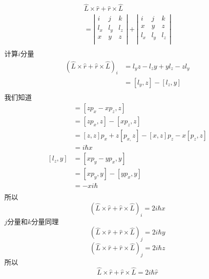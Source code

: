 $$
\begin{array}{l}
	\hat{L}\times \hat{r}+\hat{r}\times \hat{L}\\
	=\left| \begin{matrix}
	i&		j&		k\\
	l_x&		l_y&		l_z\\
	x&		y&		z\\
\end{matrix} \right|+\left| \begin{matrix}
	i&		j&		k\\
	x&		y&		z\\
	l_x&		l_y&		l_z\\
\end{matrix} \right|\\
\end{array}
$$
计算$i$分量
\begin{align}
\left(\hat{L}\times \hat{r}+\hat{r}\times \hat{L}\right)_i&= l_yz-l_zy+yl_z-zl_y\\
&=\left[ l_y,z \right] -\left[ l_z,y \right]\\
\end{align}
我们知道
\begin{align}
	[l_y,z]&=\left[ zp_x-xp_z,z \right]\\
	&=\left[ zp_x,z \right] -\left[ xp_z,z \right]\\
	&=[z,z]p_x+z\left[ p_{x,}z \right] -[x,z]p_z-x\left[ p_z,z \right]\\
	&=i\hbar x\\
	[l_z,y]&=\left[ xp_y-yp_x,y \right]\\
	&=\left[ xp_y,y \right] -[yp_x,y]\\
	&=-xi\hbar\\
\end{align}
所以
$$
\left(\hat{L}\times \hat{r}+\hat{r}\times \hat{L}\right)_i=2i\hbar x
$$
$j$分量和$k$分量同理
$$
\left(\hat{L}\times \hat{r}+\hat{r}\times \hat{L}\right)_j=2i\hbar y
$$$$
\left(\hat{L}\times \hat{r}+\hat{r}\times \hat{L}\right)_j=2i\hbar z
$$
所以
$$
\hat{L}\times \hat{r}+\hat{r}\times \hat{L}=2i\hbar \hat{r}
$$